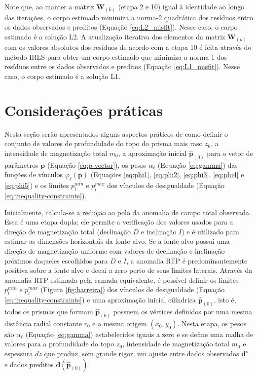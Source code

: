Note que, ao manter a matriz $\mathbf{W}_{(k)}$ (etapa 2 e 10) igual à identidade ao longo das iterações, o corpo estimado minimiza a norma-2 quadrática dos resíduos entro os dados observados e preditos (Equação \ref{eq:L2_misfit}). 
Nesse caso, o corpo estimado é a solução L2. 
A atualização iterativa dos elementos da matriz $\mathbf{W}_{(k)}$ com os valores absolutos dos resíduos de acordo com a etapa 10 é feita através do método IRLS \citep[][p. 46]{scales_gersztenkorn1988, aster_etal2019} para obter um corpo estimado que minimiza a norma-1 dos resíduos entre os dados observados e preditos 
(Equação \ref{eq:L1_misfit}). Nesse caso, o corpo estimado é a solução L1.

\section{Considerações práticas}

Nesta seção serão apresentados alguns aspectos práticos de como definir o conjunto de valores de profundidade do topo do prisma mais raso $z_{0}$, a intensidade de magnetização total $m_{0}$, a aproximação inicial
$\hat{\mathbf{p}}_{(0)}$ para o vetor de parâmetros $\mathbf{p}$ (Equação \ref{eq:p-vector}),
os pesos $\alpha_{\ell}$ (Equação \ref{eq:gamma}) das funções de vínculos 
$\varphi_{\ell}(\mathbf{p})$ 
(Equações \ref{eq:phi1}, \ref{eq:phi2}, \ref{eq:phi3}, \ref{eq:phi4} e \ref{eq:phi5}) e os limites $p_{l}^{min}$ e $p_{l}^{max}$ dos vínculos de desigualdade (Equação 
\ref{eq:inequality-constraints}).

Inicialmente, calcula-se a redução ao polo da anomalia de campo total observada. Essa é uma etapa dupla: ele permite a verificação dos valores usados para a direção de magnetização total (declinação $D$ e inclinação $I$) e é utilizado para estimar as dimensões horizontais da fonte alvo.
Se a fonte alvo possui uma direção de magnetização uniforme com valores de declinação e inclinação próximos daqueles escolhidos para $D$ e $I$, a anomalia RTP é predominantemente positiva sobre a fonte alvo e decai a zero perto de seus limites laterais.
Através da anomalia RTP estimada pela camada equivalente, é possível definir os limites $p_{l}^{min}$ e $p_{l}^{max}$ (Figura \ref{fig:barreira}) dos vínculos de desigualdade (Equação \ref{eq:inequality-constraints}) e uma aproximação inicial cilíndrica $\hat{\mathbf{p}}_{(0)}$, isto é, todos os prismas que formam $\hat{\mathbf{p}}_{(0)}$ possuem os vértices definidos por uma mesma distância radial constante $r_{0}$ e a mesma origem $(x_{0}, y_{0})$.
Nesta etapa, os pesos são $\alpha_{\ell}$ (Equação \ref{eq:gamma}) estabelecidos iguais a zero e se define uma malha de valores para a profundidade do topo $z_{0}$, intensidade de magnetização total $m_{0}$ e espessura $dz$ que produz, sem grande rigor, um ajuste entre dados observados $\mathbf{d}^{o}$ e dados preditos $\mathbf{d}(\hat{\mathbf{p}}_{(0)})$.

